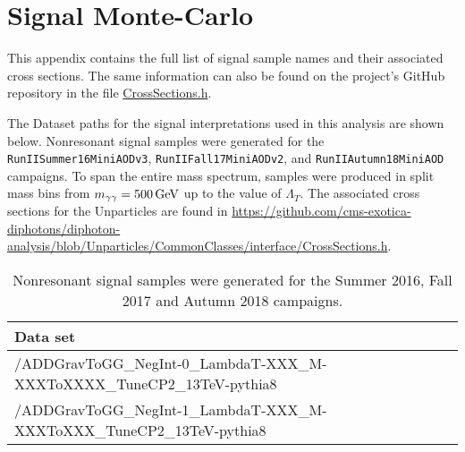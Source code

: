 \section{Signal Monte-Carlo}
\label{ch:appendix_signal_monte_carlo}
This appendix contains the full list of signal sample names and their associated cross sections. The same information can also be found on the project's GitHub repository in the file \href{https://github.com/cms-exotica-diphotons/diphoton-analysis/blob/dbd7b7b1ea7210aa55a27dcce8e84a3a5057d265/CommonClasses/interface/CrossSections.h}{CrossSections.h}.

The Dataset paths for the signal interpretations used in this analysis are shown below. Nonresonant signal samples were generated for the \texttt{RunIISummer16MiniAODv3}, \texttt{RunIIFall17MiniAODv2}, and \texttt{RunIIAutumn18MiniAOD} campaigns. To span the entire mass spectrum, samples were produced in split mass bins from $m_{\gamma\gamma} = 500\,\text{Ge\hspace{-.08em}V}$ up to the value of $\Lambda_T$.
The associated cross sections for the Unparticles are found in \url{https://github.com/cms-exotica-diphotons/diphoton-analysis/blob/Unparticles/CommonClasses/interface/CrossSections.h}.


\begin{table}[!htbp]
  \caption{Nonresonant signal samples were generated for the Summer 2016, Fall 2017 and Autumn 2018 campaigns.}
  \centering
  \vspace{\baselineskip}
  \begin{tabular}{lc}
  \hline \hline
  Data set\\
  \hline
  /ADDGravToGG\_NegInt-0\_LambdaT-XXX\_M-XXXToXXXX\_TuneCP2\_13TeV-pythia8 \\
  /ADDGravToGG\_NegInt-1\_LambdaT-XXX\_M-XXXToXXX\_TuneCP2\_13TeV-pythia8 \\
  \hline \hline
  \end{tabular}
  \label{table:ADDsamples}
\end{table}

